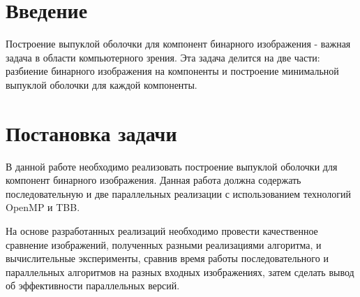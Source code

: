 \documentclass{report}
\begin{document}
\setcounter{page}{2}

\section*{Введение}
Построение выпуклой оболочки для компонент бинарного изображения - важная задача в области компьютерного зрения. Эта задача делится на две части: разбиение бинарного изображения на компоненты и построение минимальной выпуклой оболочки для каждой компоненты.
\newpage

\section*{Постановка задачи}
В данной работе необходимо реализовать построение выпуклой оболочки для компонент бинарного изображения. Данная работа должна содержать последовательную и две параллельных реализации с использованием технологий OpenMP и TBB. 
\par
На основе разработанных реализаций необходимо провести качественное сравнение изображений, полученных разными реализациями алгоритма, и вычислительные эксперименты, сравнив время работы последовательного и параллельных алгоритмов на разных входных изображениях, затем сделать вывод об эффективности параллельных версий.
\newpage

\end{document}
